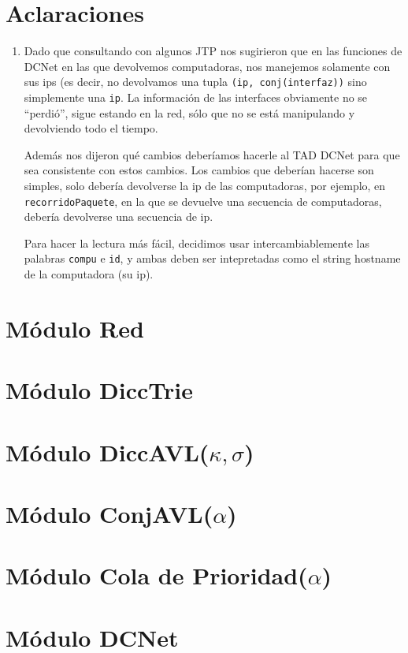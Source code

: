 \documentclass[a4paper,10pt, nofootinbib]{article}
\begin{document}
\maketitle
\thispagestyle{empty}

\section{Aclaraciones}
\begin{enumerate}
  \item Dado que consultando con algunos JTP nos sugirieron que en las funciones de DCNet en las que devolvemos computadoras, nos manejemos solamente con sus ips (es decir, no devolvamos una tupla \texttt{(ip, conj(interfaz))} sino simplemente una \texttt{ip}. La información de las interfaces obviamente no se ``perdió'', sigue estando en la red, sólo que no se está manipulando y devolviendo todo el tiempo.
   
    Además nos dijeron qué cambios deberíamos hacerle al TAD DCNet para que sea consistente con estos cambios. Los cambios que deberían hacerse son simples, solo debería devolverse la ip de las computadoras, por ejemplo, en \texttt{recorridoPaquete}, en la que se devuelve una secuencia de computadoras, debería devolverse una secuencia de ip.
    
    Para hacer la lectura más fácil, decidimos usar intercambiablemente las palabras \texttt{compu} e \texttt{id}, y ambas deben ser intepretadas como el string hostname de la computadora (su ip).


\end{enumerate}

\clearpage


\section{Módulo Red}

\clearpage

\section{Módulo DiccTrie}

\clearpage

\section{Módulo DiccAVL($\kappa, \sigma$)}

\clearpage

\section{Módulo ConjAVL($\alpha$)}

\clearpage


\section{Módulo Cola de Prioridad($\alpha$)}

\clearpage

\section{Módulo DCNet}


\clearpage
\end{document}
